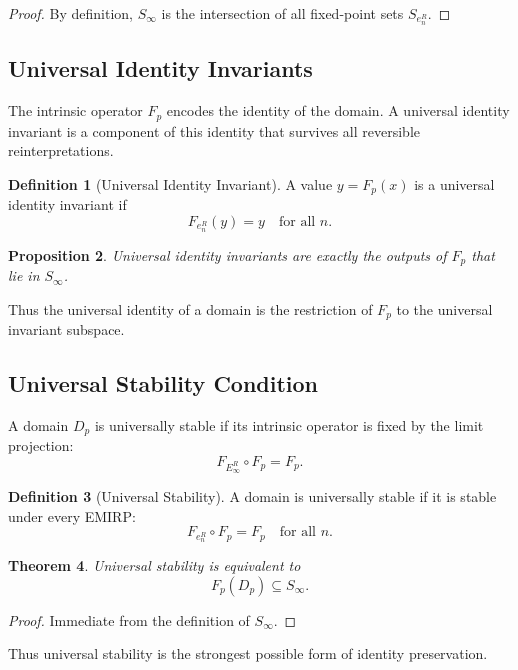 \documentclass[11pt]{article}
\theoremstyle{definition}
\newtheorem{definition}{Definition}[section]
\theoremstyle{plain}
\newtheorem{theorem}[definition]{Theorem}
\newtheorem{proposition}[definition]{Proposition}
\theoremstyle{remark}
\begin{document}
\begin{proof}
By definition, $S_\infty$ is the intersection of all fixed-point sets
$S_{e_n^R}$.
\end{proof}

\subsection{Universal Identity Invariants}

The intrinsic operator $F_p$ encodes the identity of the domain. A
universal identity invariant is a component of this identity that
survives all reversible reinterpretations.

\begin{definition}[Universal Identity Invariant]
A value $y = F_p(x)$ is a universal identity invariant if
\[
F_{e_n^R}(y) = y
\quad \text{for all } n.
\]
\end{definition}

\begin{proposition}
Universal identity invariants are exactly the outputs of $F_p$ that lie
in $S_\infty$.
\end{proposition}

Thus the universal identity of a domain is the restriction of $F_p$ to
the universal invariant subspace.

\subsection{Universal Stability Condition}

A domain $D_p$ is universally stable if its intrinsic operator is fixed
by the limit projection:
\[
F_{E_\infty^R} \circ F_p = F_p.
\]

\begin{definition}[Universal Stability]
A domain is universally stable if it is stable under every EMIRP:
\[
F_{e_n^R} \circ F_p = F_p
\quad \text{for all } n.
\]
\end{definition}

\begin{theorem}
Universal stability is equivalent to
\[
F_p(D_p) \subseteq S_\infty.
\]
\end{theorem}

\begin{proof}
Immediate from the definition of $S_\infty$.
\end{proof}

Thus universal stability is the strongest possible form of identity
preservation.
\end{document}
